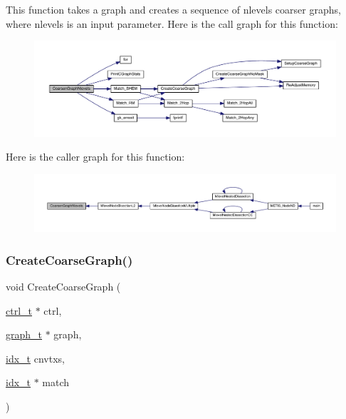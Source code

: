 This function takes a graph and creates a sequence of nlevels coarser graphs, where nlevels is an input parameter. Here is the call graph for this function\+:\nopagebreak
\begin{figure}[H]
\begin{center}
\leavevmode
\includegraphics[width=350pt]{a00182_afa83320e3b311e0feef90d0bf4303716_cgraph}
\end{center}
\end{figure}
Here is the caller graph for this function\+:\nopagebreak
\begin{figure}[H]
\begin{center}
\leavevmode
\includegraphics[width=350pt]{a00182_afa83320e3b311e0feef90d0bf4303716_icgraph}
\end{center}
\end{figure}
\mbox{\label{a00182_aac8820421b1c25698140c1b470c50e07}} 
\subsubsection{\texorpdfstring{Create\+Coarse\+Graph()}{CreateCoarseGraph()}}
{\footnotesize\ttfamily void Create\+Coarse\+Graph (\begin{DoxyParamCaption}\item[{\hyperlink{a00742}{ctrl\+\_\+t} $\ast$}]{ctrl,  }\item[{\hyperlink{a00734}{graph\+\_\+t} $\ast$}]{graph,  }\item[{\hyperlink{a00876_aaa5262be3e700770163401acb0150f52}{idx\+\_\+t}}]{cnvtxs,  }\item[{\hyperlink{a00876_aaa5262be3e700770163401acb0150f52}{idx\+\_\+t} $\ast$}]{match }\end{DoxyParamCaption})}


